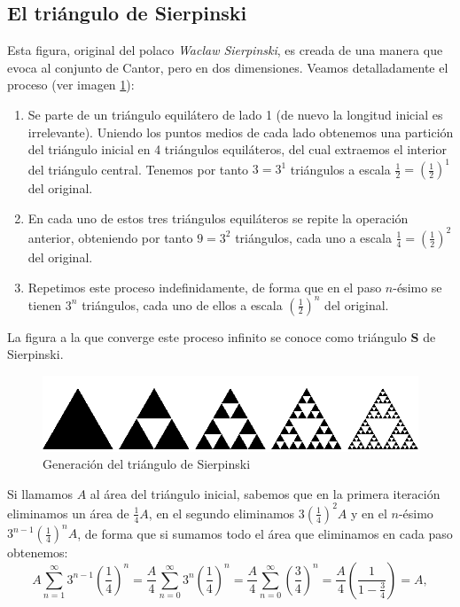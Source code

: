 \subsection{El triángulo de Sierpinski}
\label{subsection:triangulo-Sierpinski} 

Esta figura, original del polaco \textit{Waclaw Sierpinski}, es creada de una manera que evoca al conjunto de Cantor, pero en dos dimensiones. Veamos detalladamente el proceso (ver imagen \ref{fig:triangulo-Sierpinski}):

\begin{enumerate}
\item Se parte de un triángulo equilátero de lado 1 (de nuevo la longitud inicial es irrelevante). Uniendo los puntos medios de cada lado obtenemos una partición del triángulo inicial en 4 triángulos equiláteros, del cual extraemos el interior del triángulo central. Tenemos por tanto $3=3^1$ triángulos a escala $\frac 1 2 = \left(\frac 1 2\right)^1$ del original.

\item En cada uno de estos tres triángulos equiláteros se repite la operación anterior, obteniendo por tanto $9=3^2$ triángulos, cada uno a escala $\frac 1 4 = \left(\frac 1 2\right)^2$ del original.

\item Repetimos este proceso indefinidamente, de forma que en el paso $n$-ésimo se tienen $3^n$ triángulos, cada uno de ellos a escala $\left(\frac 1 2\right)^n$ del original.
\end{enumerate}

La figura a la que converge este proceso infinito se conoce como triángulo \textbf{S} de Sierpinski.

\begin{figure} [ht]
\centering
\includegraphics[scale = 0.6]{img/Sierpinski-triangle.png}
\caption{Generación del triángulo de Sierpinski}
 \label{fig:triangulo-Sierpinski}
\end{figure}

Si llamamos $A$ al área del triángulo inicial, sabemos que en la primera iteración eliminamos un área de $\frac 1 4 A$, en el segundo eliminamos $3 \left(\frac 1 4\right)^2 A$ y en el $n$-ésimo $3^{n-1}\left(\frac 1 4\right)^n A$, de forma que si sumamos todo el área que eliminamos en cada paso obtenemos:
$$
A \sum_{n=1}^\infty 3^{n-1}\left(\frac 1 4\right)^n  = \frac A 4  \sum_{n=0}^\infty 3^n\left(\frac 1 4\right)^n =  \frac A 4  \sum_{n=0}^\infty \left(\frac 3 4\right)^n = \frac{A}{4} \left(\frac{1}{1-\frac{3}{4}}\right) = A,
$$

